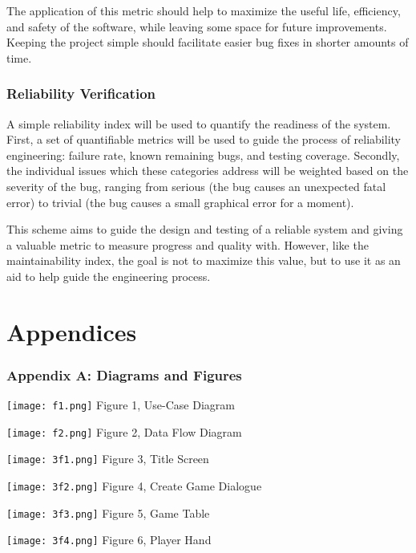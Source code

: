 \documentclass[12pt]{article}
\begin{document}
The application of this metric should help to maximize the useful life, 
efficiency, and safety of the software, while leaving some space for future 
improvements. Keeping the project simple should facilitate easier bug fixes
in shorter amounts of time.

\section{Reliability Verification}
A simple reliability index will be used to quantify the readiness of the system.
First, a set of quantifiable metrics will be used to guide the process of 
reliability engineering: failure rate, known remaining bugs, and testing 
coverage.  Secondly, the individual issues which these categories address
will be weighted based on the severity of the bug, ranging from serious (the
bug causes an unexpected fatal error) to trivial (the bug causes a small
graphical error for a moment).

This scheme aims to guide the design and testing of a reliable system and giving
a valuable metric to measure progress and quality with.  However, like the
maintainability index, the goal is not to maximize this value, but to
use it as an aid to help guide the engineering process.

\part{Appendices}
\section{Appendix A: Diagrams and Figures}


\texttt{[image: f1.png]}
\newline
Figure 1, Use-Case Diagram

\texttt{[image: f2.png]}
\newline
Figure 2, Data Flow Diagram

\texttt{[image: 3f1.png]}
\newline
Figure 3, Title Screen

\texttt{[image: 3f2.png]}
\newline
Figure 4, Create Game Dialogue

\texttt{[image: 3f3.png]}
\newline
Figure 5, Game Table

\texttt{[image: 3f4.png]}
\newline
Figure 6, Player Hand
\end{document}

